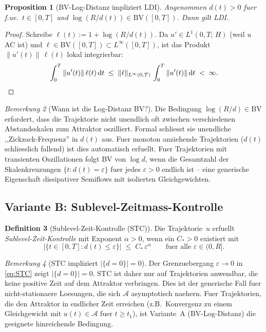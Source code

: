 \documentclass[12pt,a4paper]{article}
\theoremstyle{definition}
\newtheorem{definition}{Definition}[section]
\theoremstyle{plain}
\newtheorem{proposition}[definition]{Proposition}
\theoremstyle{remark}
\newtheorem{remark}[definition]{Bemerkung}
\newcommand{\BV}{\mathrm{BV}}
\begin{document}
\begin{proposition}[BV-Log-Distanz impliziert LDI]
\label{prop:variant-A}
Angenommen $d(t) > 0$ fuer f.ue.\ $t \in [0,T]$ und
$\log(R/d(t)) \in \BV([0,T])$.  Dann gilt LDI.
\end{proposition}

\begin{proof}
Schreibe $\ell(t) := 1 + \log(R/d(t))$.  Da $u' \in L^1(0,T;\,H)$
(weil $u$ AC ist) und $\ell \in \BV([0,T]) \subset
L^\infty([0,T])$, ist das Produkt
$\|u'(t)\|\,\ell(t)$ lokal integrierbar:
\[
  \int_0^T \|u'(t)\|\,\ell(t)\,\mathrm{d}t
  \;\le\;
  \|\ell\|_{L^\infty(0,T)}\,\int_0^T \|u'(t)\|\,\mathrm{d}t
  \;<\; \infty.  \qedhere
\]
\end{proof}

\begin{remark}[Wann ist die Log-Distanz BV?]
\label{rem:log-BV}
Die Bedingung $\log(R/d) \in \BV$ erfordert, dass die Trajektorie
nicht unendlich oft zwischen verschiedenen Abstandsskalen zum
Attraktor oszilliert.  Formal schliesst sie unendliche
,,Zickzack-Frequenz'' in $d(t)$ aus.  Fuer monoton anziehende
Trajektorien ($d(t)$ schliesslich fallend) ist dies automatisch
erfuellt.  Fuer Trajektorien mit transienten Oszillationen folgt
BV von $\log d$, wenn die Gesamtzahl der Skalenkreuzungen
$\{t : d(t) = \varepsilon\}$ fuer jedes
$\varepsilon > 0$ endlich ist -- eine generische Eigenschaft
dissipativer Semiflows mit isolierten Gleichgewichten.
\end{remark}

\subsection{Variante B: Sublevel-Zeitmass-Kontrolle}

\begin{definition}[Sublevel-Zeit-Kontrolle (STC)]
\label{def:STC}
Die Trajektorie~$u$ erfuellt \emph{Sublevel-Zeit-Kontrolle} mit
Exponent $\alpha > 0$, wenn ein $C_* > 0$ existiert mit
\begin{equation}\label{eq:STC}
  \bigl|\{t \in [0,T] : d(t) \le \varepsilon\}\bigr|
  \;\le\;
  C_*\,\varepsilon^\alpha
  \qquad \text{fuer alle } \varepsilon \in (0, R].
  \tag{STC}
\end{equation}
\end{definition}

\begin{remark}[STC impliziert $|\{d=0\}| = 0$]
\label{rem:STC-d0}
Der Grenzuebergang $\varepsilon \to 0$ in \eqref{eq:STC} zeigt
$|\{d = 0\}| = 0$.  STC ist daher nur auf Trajektorien anwendbar,
die keine positive Zeit auf dem Attraktor verbringen.  Dies ist der
generische Fall fuer nicht-stationaere Loesungen, die sich
$\mathcal{A}$ asymptotisch naehern.  Fuer Trajektorien, die den
Attraktor in endlicher Zeit erreichen (z.B.\ Konvergenz zu einem
Gleichgewicht mit $u(t) \in \mathcal{A}$ fuer $t \ge t_1$), ist
Variante~A (BV-Log-Distanz) die geeignete hinreichende Bedingung.
\end{remark}
\end{document}
